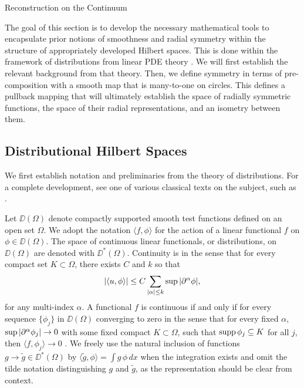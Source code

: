\setlength{\parindent}{2ex}
\begin{chapter}{Reconstruction on the Continuum}\label{chapter:theoretical}

The goal of this section is to develop the necessary mathematical tools to encapsulate prior notions of smoothness and radial symmetry within the structure of appropriately developed Hilbert spaces.
This is done within the framework of distributions from linear PDE theory \cite{hormander1983,rudin1991,griffel2002}. %
We will first establish the relevant background from that theory.
Then, we define symmetry in terms of pre-composition with a smooth map that is many-to-one on circles.  
This defines a pullback mapping that will ultimately establish the space of radially symmetric functions, the space of their radial representations, and an isometry between them.  

\subsection{Distributional Hilbert Spaces}
We first establish notation and preliminaries from the theory of distributions.
For a complete development, see one of various classical texts on the subject, such as \cite{hormander1983,rudin1991}.

Let $\DD(\Omega)$ denote compactly supported smooth test functions defined on an open set $\Omega$.
We adopt the notation $\langle f, \phi\rangle$ for the action of a linear functional $f$ on $\phi \in \DD(\Omega)$. 
The space of continuous linear functionals, or distributions, on $\DD(\Omega)$ are denoted with $\DD^*(\Omega)$. 
Continuity is in the sense that for every compact set $K \subset \Omega$, there exists $C$ and $k$ so that
\begin{equation}
  |\langle u, \phi \rangle | \le C \sum_{|\alpha| \le k} \sup |\partial^\alpha \phi|,
\end{equation} 
for any multi-index $\alpha$.
A functional $f$ is continuous if and only if for every sequence $\{\phi_j\}$ in $\DD(\Omega)$ converging to zero in the sense that for every fixed $\alpha$, $\sup |\partial^\alpha \phi_j| \to 0$ with some fixed compact $K \subset \Omega$, such that $\operatorname*{supp} \phi_j \subseteq K$ for all $j$, then $\langle f, \phi_j\rangle \to 0$ \cite{hormander1983}.
We freely use the natural inclusion of functions $g \to \tilde g \in \DD^*(\Omega)$ by $\langle \tilde g, \phi \rangle = \int g\, \phi\,dx$ when the integration exists and omit the tilde notation distinguishing $g$ and $\tilde g$, as the representation should be clear from context. 


\end{chapter}
